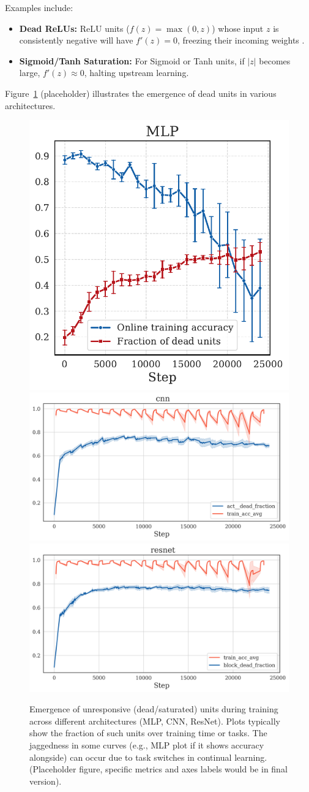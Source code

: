 \documentclass{article}
\begin{document}
Examples include:
\begin{itemize}
    \item \textbf{Dead ReLUs:} ReLU units ($f(z) = \max(0, z)$) whose input $z$ is consistently negative will have $f'(z)=0$, freezing their incoming weights \citep{nair2010rectified}.
    \item \textbf{Sigmoid/Tanh Saturation:} For Sigmoid or Tanh units, if $|z|$ becomes large, $f'(z) \approx 0$, halting upstream learning.
\end{itemize}
Figure~\ref{fig:DeadReLUs-LoP} (placeholder) illustrates the emergence of dead units in various architectures.

\begin{figure}[h!]
    \centering
    \includegraphics[width=0.23\linewidth]{mlp_act__dead_fraction_plot.pdf} %
    \includegraphics[width=0.38\linewidth]{dead_frac_cnn.png} %
    \includegraphics[width=0.38\linewidth]{dead_frac_resnet.png} %
    \caption{Emergence of unresponsive (dead/saturated) units during training across different architectures (MLP, CNN, ResNet). Plots typically show the fraction of such units over training time or tasks. The jaggedness in some curves (e.g., MLP plot if it shows accuracy alongside) can occur due to task switches in continual learning. (Placeholder figure, specific metrics and axes labels would be in final version).}
    \label{fig:DeadReLUs-LoP}
\end{figure}
\end{document}
